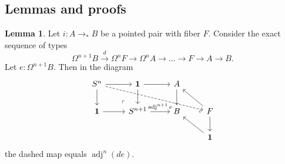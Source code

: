 \documentclass{amsart}
\theoremstyle{definition}
\newtheorem{lem}[theorem]{Lemma}
\newcommand{\pto}{\to_*}
\newcommand{\adj}[1]{\operatorname{adj}^{#1}}
\newcommand{\sgtn}{\mathbf{1}}
\begin{document}
\subsection{Lemmas and proofs}
\begin{lem}\label{le:LES-isom}
    Let $i: A \pto B$ be a pointed pair with fiber $F$. Consider the exact sequence of types
    $$\Omega^{n+1} B \xrightarrow{d} \Omega^n F \to \Omega^n A \to \ldots \to F \to A \to B.$$
    Let $e: \Omega^{n+1} B$. Then in the diagram
    \[
    \begin{tikzcd}
    	{S^n} & \sgtn & A \\
    	\sgtn & {S^{n+1}} & B & F \\
    	&&& \sgtn
    	\arrow[from=1-1, to=1-2]
    	\arrow[from=1-1, to=2-1]
    	\arrow[dashed, from=1-1, to=2-4]
    	\arrow[from=1-2, to=1-3]
    	\arrow[from=1-2, to=2-2]
    	\arrow[from=1-3, to=2-3]
    	\arrow[from=2-1, to=2-2]
    	\arrow["\lrcorner"{anchor=center, pos=0.125, rotate=180}, draw=none, from=2-2, to=1-1]
    	\arrow["{\adj{n+1}e}", from=2-2, to=2-3]
    	\arrow[from=2-4, to=1-3]
    	\arrow["\lrcorner"{anchor=center, pos=0.125, rotate=-135}, draw=none, from=2-4, to=2-3]
    	\arrow[from=2-4, to=3-4]
    	\arrow[from=3-4, to=2-3]
    \end{tikzcd}
    \]
    the dashed map equals $\adj{n}(de)$.
\end{lem}
\end{document}
